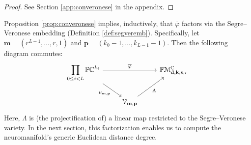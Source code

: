 \documentclass[twoside]{article}
\theoremstyle{plain}%
\theoremstyle{definition}
\theoremstyle{remark}
\newtheorem{rmk}{Remark}[section]
\newcommand{\conv}[1]{\star_{#1}}
\begin{document}
\begin{proof}   
See Section \ref{app:converonese} in the appendix. 
\end{proof}
Proposition \ref{prop:converonese} implies, inductively, that $\overline{\varphi}$ factors via the Segre--Veronese embedding (Definition \ref{def:segveremb}). Specifically, let $\mathbf{m} = (r^{L-1}, \ldots, r, 1)$ and $\mathbf{p} = (k_0 - 1, \ldots, k_{L-1} - 1)$. Then the following diagram commutes: 
\begin{equation*}
\begin{tikzcd}
	{\displaystyle \prod_{0 \leq i < L} \mathbb{P}\mathbb{C}^{k_i} } && \mathbb{P}\mathcal{M}_{\mathbf{d}, \mathbf{k}, \mathbf{s}, r}^\mathbb{C} \\
	& \mathcal{V}_{\mathbf{m}, \mathbf{p}}
	\arrow["\overline{\varphi}",from=1-1, to=1-3]
	\arrow["{ \nu_{\mathbf{m}, \mathbf{p}}}"', from=1-1, to=2-2]
	\arrow["\Lambda"', from=2-2, to=1-3]
\end{tikzcd}
\end{equation*}
Here, $\Lambda$ is (the projectification of) a linear map restricted to the Segre--Veronese variety. In the next section, this factorization  enables us to compute the neuromanifold's generic Euclidean distance degree. 
\end{document}
